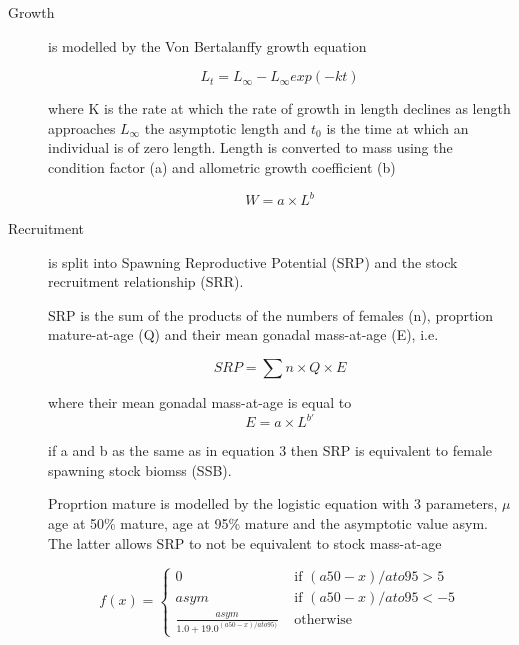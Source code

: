 \documentclass[10pt]{article}
\begin{document}
\begin{description}
    \item[Growth] is modelled by the Von Bertalanffy growth equation \cite{von1957quantitative}

      \begin{equation} L_t = L_{\infty} - L_{\infty}exp(-kt) \end{equation}
         
where  K is the rate at which the rate of growth in length declines as length approaches $L_{\infty}$ 
the asymptotic length and $t_{0}$ is the time at which an individual is of zero length. 
Length is converted to mass using the condition factor (a) and allometric growth coefficient (b)

\begin{equation} W = a \times L^b \end{equation}

 \item[Recruitment] is split into Spawning Reproductive Potential (SRP) and the stock recruitment relationship (SRR).

SRP is the sum of the products of the numbers of females (n), proprtion mature-at-age (Q) and their mean gonadal mass-at-age (E), i.e. 

   \begin{equation} SRP = \sum{n \times Q \times E } \end{equation}

where their mean gonadal mass-at-age is equal to 
\begin{equation} E = a \times L^{b\prime} \end{equation}

if a and b as the same as in equation 3 then SRP is equivalent to female spawning stock biomss (SSB).

Proprtion mature is modelled by the logistic equation with 3 parameters, $\mu$ age at 50\% mature, age at 95\% mature and the asymptotic value asym. The 
latter allows SRP to not be equivalent to stock mass-at-age

\begin{equation}
f(x) = \left\{ \begin{array}{ll}
			0                                 &\mbox{ if $(a50-x)/ato95 >  5$} \\
			asym                              &\mbox{ if $(a50-x)/ato95 < -5$} \\
			\frac{asym}{1.0+19.0^{(a50-x)/ato95)}} &\mbox{ otherwise}
		\end{array}
       \right.
\end{equation}


\end{description}
\end{document}
